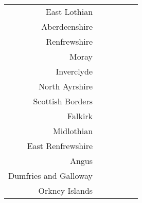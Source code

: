 \documentclass[
  12pt,
]{article}
\begin{document}
\begin{longtable}[t]{rrrrrr}
East Lothian & \cellcolor{white}{ 101.1\%} & \cellcolor{white}{ 100.2\%} & \cellcolor{white}{  95.8\%} & \cellcolor{white}{  84.7\%} & \cellcolor{white}{  80.5\%}\\
Aberdeenshire & \cellcolor{white}{ 141.1\%} & \cellcolor{white}{ 138.4\%} & \cellcolor{white}{ 123.7\%} & \cellcolor{white}{1128.3\%} & \cellcolor{white}{ 103.2\%}\\
Renfrewshire & \cellcolor{white}{  41.5\%} & \cellcolor{white}{  53.3\%} & \cellcolor{white}{  50.2\%} & \cellcolor{white}{ 183.4\%} & \cellcolor{white}{ 178.1\%}\\
Moray & \cellcolor{white}{  64.2\%} & \cellcolor{white}{  40.1\%} & \cellcolor{white}{  54.0\%} & \cellcolor{white}{ 452.5\%} & \cellcolor{white}{  74.1\%}\\
Inverclyde & \cellcolor{white}{ 100.3\%} & \cellcolor{white}{  91.3\%} & \cellcolor{white}{  95.1\%} & \cellcolor{white}{ 426.2\%} & \cellcolor{white}{ 186.8\%}\\
North Ayrshire & \cellcolor{white}{ 236.2\%} & \cellcolor{white}{ 204.6\%} & \cellcolor{white}{ 238.2\%} & \cellcolor{white}{ 381.9\%} & \cellcolor{white}{ 224.2\%}\\
Scottish Borders & \cellcolor{white}{ 234.5\%} & \cellcolor{white}{ 179.0\%} & \cellcolor{white}{ 336.2\%} & \cellcolor{white}{ 604.5\%} & \cellcolor{white}{ 259.7\%}\\
Falkirk & \cellcolor{white}{  66.9\%} & \cellcolor{white}{  61.2\%} & \cellcolor{white}{  55.7\%} & \cellcolor{white}{ 151.2\%} & \cellcolor{white}{  71.4\%}\\
Midlothian & \cellcolor{white}{} & \cellcolor{white}{ 184.5\%} & \cellcolor{white}{ 138.4\%} & \cellcolor{white}{ 189.1\%} & \cellcolor{white}{ 180.4\%}\\
East Renfrewshire & \cellcolor{white}{ 174.1\%} & \cellcolor{white}{ 181.6\%} & \cellcolor{white}{ 267.5\%} & \cellcolor{white}{1256.2\%} & \cellcolor{white}{ 333.7\%}\\
Angus & \cellcolor{white}{} & \cellcolor{white}{  39.6\%} & \cellcolor{white}{  35.4\%} & \cellcolor{white}{ 190.0\%} & \cellcolor{white}{ 267.5\%}\\
Dumfries and Galloway & \cellcolor{white}{1252.9\%} & \cellcolor{white}{1818.2\%} & \cellcolor{white}{2500.0\%} & \cellcolor{white}{} & \cellcolor{white}{3157.1\%}\\
Orkney Islands & \cellcolor{white}{  89.9\%} & \cellcolor{white}{  90.7\%} & \cellcolor{white}{  89.9\%} & \cellcolor{white}{ 229.0\%} & \cellcolor{white}{ 218.8\%}\\

\end{longtable}
\end{document}
